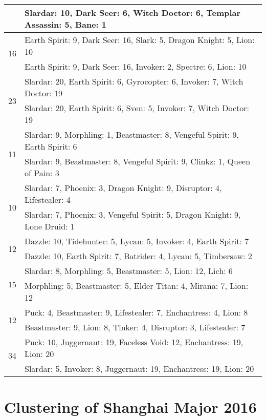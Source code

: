 \documentclass[result.tex]{subfiles}
\begin{document}
\begin{table}[H]
\begin{tabular}{ | c | p{12.5cm} | }
    & Slardar: 10, Dark Seer: 6, Witch Doctor: 6, Templar Assassin: 5, Bane: 1 \\
    \hline
    \multirow{2}{*}{16}
    & Earth Spirit: 9, Dark Seer: 16, Slark: 5, Dragon Knight: 5, Lion: 10 \\
    & Earth Spirit: 9, Dark Seer: 16, Invoker: 2, Spectre: 6, Lion: 10 \\
    \hline
    \multirow{2}{*}{23}
    & Slardar: 20, Earth Spirit: 6, Gyrocopter: 6, Invoker: 7, Witch Doctor: 19 \\
    & Slardar: 20, Earth Spirit: 6, Sven: 5, Invoker: 7, Witch Doctor: 19 \\
    \hline
    \multirow{2}{*}{11}
    & Slardar: 9, Morphling: 1, Beastmaster: 8, Vengeful Spirit: 9, Earth Spirit: 6 \\
    & Slardar: 9, Beastmaster: 8, Vengeful Spirit: 9, Clinkz: 1, Queen of Pain: 3 \\
    \hline
    \multirow{2}{*}{10}
    & Slardar: 7, Phoenix: 3, Dragon Knight: 9, Disruptor: 4, Lifestealer: 4 \\
    & Slardar: 7, Phoenix: 3, Vengeful Spirit: 5, Dragon Knight: 9, Lone Druid: 1 \\
    \hline
    \multirow{2}{*}{12}
    & Dazzle: 10, Tidehunter: 5, Lycan: 5, Invoker: 4, Earth Spirit: 7 \\
    & Dazzle: 10, Earth Spirit: 7, Batrider: 4, Lycan: 5, Timbersaw: 2 \\
    \hline
    \multirow{2}{*}{15}
    & Slardar: 8, Morphling: 5, Beastmaster: 5, Lion: 12, Lich: 6 \\
    & Morphling: 5, Beastmaster: 5, Elder Titan: 4, Mirana: 7, Lion: 12 \\
    \hline
    \multirow{2}{*}{12}
    & Puck: 4, Beastmaster: 9, Lifestealer: 7, Enchantress: 4, Lion: 8 \\
    & Beastmaster: 9, Lion: 8, Tinker: 4, Disruptor: 3, Lifestealer: 7 \\
    \hline
    \multirow{2}{*}{34}
    & Puck: 10, Juggernaut: 19, Faceless Void: 12, Enchantress: 19, Lion: 20 \\
    & Slardar: 5, Invoker: 8, Juggernaut: 19, Enchantress: 19, Lion: 20 \\
    \hline
  \end{tabular}
  \caption{}
  \label{}
\end{table}

\newpage

\section*{Clustering of Shanghai Major 2016}
\end{document}
